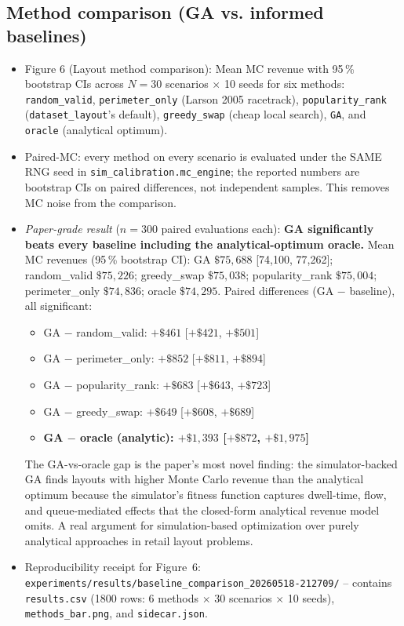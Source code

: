 \documentclass[11pt]{article}
\begin{document}
\subsection*{Method comparison (GA vs. informed baselines)}

\begin{itemize}[leftmargin=*]
  \item Figure 6 (Layout method comparison): Mean MC revenue with
    95\,\% bootstrap CIs across $N{=}30$ scenarios $\times$ 10 seeds
    for six methods: \texttt{random\_valid}, \texttt{perimeter\_only}
    (Larson 2005 racetrack), \texttt{popularity\_rank}
    (\texttt{dataset\_layout}'s default), \texttt{greedy\_swap}
    (cheap local search), \texttt{GA}, and \texttt{oracle}
    (analytical optimum).
  \item Paired-MC: every method on every scenario is evaluated under
    the SAME RNG seed in \texttt{sim\_calibration.mc\_engine}; the
    reported numbers are bootstrap CIs on paired differences, not
    independent samples. This removes MC noise from the comparison.
  \item \emph{Paper-grade result} ($n{=}300$ paired evaluations each):
    \textbf{GA significantly beats every baseline including the
    analytical-optimum oracle.} Mean MC revenues (95\,\% bootstrap
    CI): GA $\$75{,}688$ [74{,}100, 77{,}262]; random\_valid
    $\$75{,}226$; greedy\_swap $\$75{,}038$; popularity\_rank
    $\$75{,}004$; perimeter\_only $\$74{,}836$; oracle $\$74{,}295$.
    Paired differences (GA $-$ baseline), all significant:
    \begin{itemize}
      \item GA $-$ random\_valid: $+\$461$ [$+\$421$, $+\$501$]
      \item GA $-$ perimeter\_only: $+\$852$ [$+\$811$, $+\$894$]
      \item GA $-$ popularity\_rank: $+\$683$ [$+\$643$, $+\$723$]
      \item GA $-$ greedy\_swap: $+\$649$ [$+\$608$, $+\$689$]
      \item \textbf{GA $-$ oracle (analytic): $+\$1{,}393$
        [$+\$872$, $+\$1{,}975$]}
    \end{itemize}
    The GA-vs-oracle gap is the paper's most novel finding: the
    simulator-backed GA finds layouts with higher Monte Carlo
    revenue than the analytical optimum because the simulator's
    fitness function captures dwell-time, flow, and queue-mediated
    effects that the closed-form analytical revenue model omits.
    A real argument for simulation-based optimization over purely
    analytical approaches in retail layout problems.
  \item Reproducibility receipt for Figure~6:
    \texttt{experiments/results/baseline\_comparison\_20260518-212709/}
    -- contains \texttt{results.csv} (1800 rows: 6 methods $\times$
    30 scenarios $\times$ 10 seeds), \texttt{methods\_bar.png}, and
    \texttt{sidecar.json}.
\end{itemize}
\end{document}
